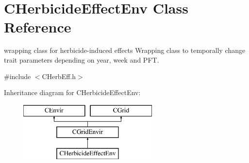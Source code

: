 \hypertarget{class_c_herbicide_effect_env}{}\section{C\+Herbicide\+Effect\+Env Class Reference}
\label{class_c_herbicide_effect_env}


wrapping class for herbicide-\/induced effects Wrapping class to temporally change trait parameters depending on year, week and P\+FT.  




{\ttfamily \#include $<$C\+Herb\+Eff.\+h$>$}

Inheritance diagram for C\+Herbicide\+Effect\+Env\+:\begin{figure}[H]
\begin{center}
\leavevmode
\includegraphics[height=3.000000cm]{class_c_herbicide_effect_env}
\end{center}
\end{figure}
